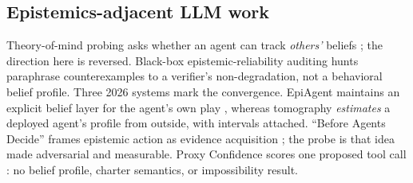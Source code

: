 \subsection{Epistemics-adjacent LLM work}

Theory-of-mind probing asks whether an agent can track \emph{others'}
beliefs \cite{strachan2024}; the direction here is reversed. Black-box
epistemic-reliability auditing \cite{eraudit} hunts paraphrase
counterexamples to a verifier's non-degradation, not a behavioral belief
profile. Three 2026 systems mark the convergence. EpiAgent maintains an
explicit belief layer for the agent's own play \cite{epiagent}, whereas
tomography \emph{estimates} a deployed agent's profile from outside, with
intervals attached. ``Before Agents Decide'' frames epistemic action as
evidence acquisition \cite{beforedecide}; the probe is that idea made
adversarial and measurable. Proxy Confidence scores one proposed tool call
\cite{proxyconfidence}: no belief profile, charter semantics, or
impossibility result.
